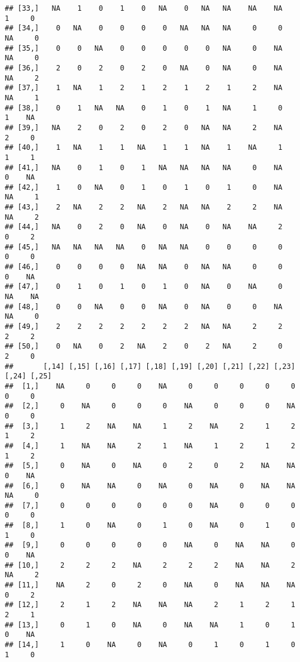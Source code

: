 \documentclass[
]{article}
\begin{document}
\begin{verbatim}
## [33,]   NA    1    0    1    0   NA    0   NA   NA    NA    NA     1     0
## [34,]    0   NA    0    0    0    0   NA   NA   NA     0     0    NA     0
## [35,]    0    0   NA    0    0    0    0    0   NA     0    NA    NA     0
## [36,]    2    0    2    0    2    0   NA    0   NA     0    NA    NA     2
## [37,]    1   NA    1    2    1    2    1    2    1     2    NA    NA     1
## [38,]    0    1   NA   NA    0    1    0    1   NA     1     0     1    NA
## [39,]   NA    2    0    2    0    2    0   NA   NA     2    NA     2     0
## [40,]    1   NA    1    1   NA    1    1   NA    1    NA     1     1     1
## [41,]   NA    0    1    0    1   NA   NA   NA   NA     0    NA     0    NA
## [42,]    1    0   NA    0    1    0    1    0    1     0    NA    NA     1
## [43,]    2   NA    2    2   NA    2   NA   NA    2     2    NA    NA     2
## [44,]   NA    0    2    0   NA    0   NA    0   NA    NA     2     0     2
## [45,]   NA   NA   NA   NA    0   NA   NA    0    0     0     0     0     0
## [46,]    0    0    0    0   NA   NA    0   NA   NA     0     0     0    NA
## [47,]    0    1    0    1    0    1    0   NA    0    NA     0    NA    NA
## [48,]    0    0   NA    0    0   NA    0   NA    0     0    NA    NA     0
## [49,]    2    2    2    2    2    2    2   NA   NA     2     2     2     2
## [50,]    0   NA    0    2   NA    2    0    2   NA     2     0     2     0
##       [,14] [,15] [,16] [,17] [,18] [,19] [,20] [,21] [,22] [,23] [,24] [,25]
##  [1,]    NA     0     0     0    NA     0     0     0     0     0     0     0
##  [2,]     0    NA     0     0     0    NA     0     0     0    NA     0     0
##  [3,]     1     2    NA    NA     1     2    NA     2     1     2     1     2
##  [4,]     1    NA    NA     2     1    NA     1     2     1     2     1     2
##  [5,]     0    NA     0    NA     0     2     0     2    NA    NA     0    NA
##  [6,]     0    NA    NA     0    NA     0    NA     0    NA    NA    NA     0
##  [7,]     0     0     0     0     0     0    NA     0     0     0     0     0
##  [8,]     1     0    NA     0     1     0    NA     0     1     0     1     0
##  [9,]     0     0     0     0     0    NA     0    NA    NA     0     0    NA
## [10,]     2     2     2    NA     2     2     2    NA    NA     2    NA     2
## [11,]    NA     2     0     2     0    NA     0    NA    NA    NA     0     2
## [12,]     2     1     2    NA    NA    NA     2     1     2     1     2     1
## [13,]     0     1     0    NA     0    NA    NA     1     0     1     0    NA
## [14,]     1     0    NA     0    NA     0     1     0     1     0     1     0

\end{verbatim}
\end{document}
